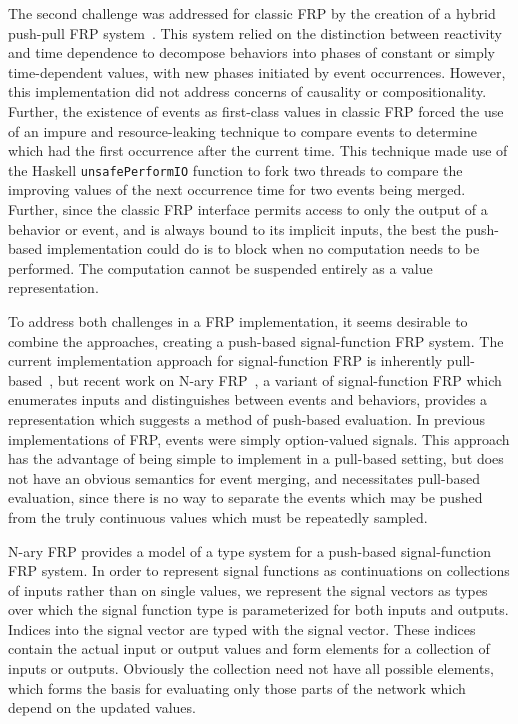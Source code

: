 The second challenge was addressed for classic FRP by the creation of a hybrid push-pull FRP system~\cite{Elliott2009}. This system relied
on the distinction between reactivity and time dependence to decompose behaviors into phases of constant or simply time-dependent values,
with new phases initiated by event occurrences. However, this implementation did not address concerns of causality or compositionality.
Further, the existence of events as first-class values in classic FRP forced the use of an impure and resource-leaking technique to compare
events to determine which had the first occurrence after the current time. This technique made use of the Haskell {\tt unsafePerformIO} function
to fork two threads to compare the improving values of the next occurrence time for two events being merged. Further, since the classic FRP
interface permits access to only the output of a behavior or event, and is always bound to its implicit inputs, the best the push-based implementation
could do is to block when no computation needs to be performed. The computation cannot be suspended entirely as a value representation.

To address both challenges in a FRP implementation, it seems desirable to combine the approaches, creating a push-based
signal-function FRP system. The current implementation approach for signal-function FRP is inherently pull-based~\cite{Nilsson2002}, but
recent work on N-ary FRP~\cite{Sculthorpe2011}, a variant of signal-function FRP which enumerates inputs and distinguishes between events and behaviors, provides a representation which suggests
a method of push-based evaluation. In previous implementations of FRP, events were simply
option-valued signals. This approach has the advantage of being simple to implement in a pull-based setting, but does not have an obvious
semantics for event merging, and necessitates pull-based evaluation, since there is no way to separate the events which may be pushed from
the truly continuous values which must be repeatedly sampled.

N-ary FRP provides a model of a type system for a push-based signal-function FRP system. In order to represent signal functions
as continuations on collections of inputs rather than on single values, we represent the signal vectors as types over which
the signal function type is parameterized for both inputs and outputs. Indices into the signal vector are typed with the signal vector. These indices
contain the actual input or output values and form elements for a collection of inputs or outputs. Obviously the collection need not have all possible elements,
which forms the basis for evaluating only those parts of the network which depend on the updated values.